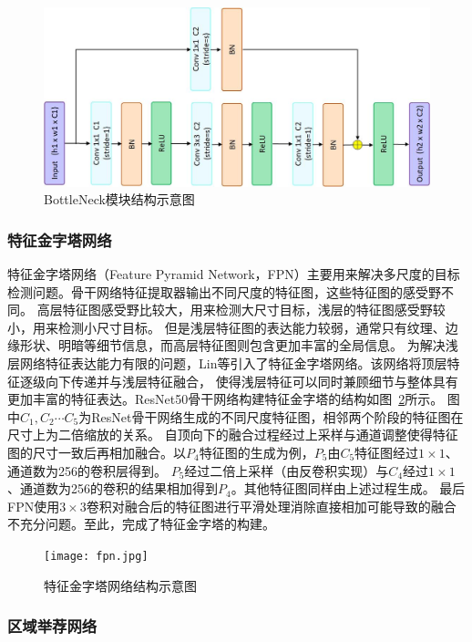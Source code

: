 \begin{figure}         
  \centering          
  \includegraphics[width=0.7\linewidth]{bottleneck.jpg}          
  \caption{BottleNeck模块结构示意图}          
  \label{fig:bottleneck}   
\end{figure}    

\subsubsection{特征金字塔网络}

特征金字塔网络（Feature Pyramid Network，FPN）主要用来解决多尺度的目标检测问题。骨干网络特征提取器输出不同尺度的特征图，这些特征图的感受野不同。
高层特征图感受野比较大，用来检测大尺寸目标，浅层的特征图感受野较小，用来检测小尺寸目标。
但是浅层特征图的表达能力较弱，通常只有纹理、边缘形状、明暗等细节信息，而高层特征图则包含更加丰富的全局信息。
为解决浅层网络特征表达能力有限的问题，Lin等\cite{2017Feature}引入了特征金字塔网络。该网络将顶层特征逐级向下传递并与浅层特征融合，
使得浅层特征可以同时兼顾细节与整体具有更加丰富的特征表达。ResNet50骨干网络构建特征金字塔的结构如图~\ref{fig:fpn}所示。
图中$C_1,C_2 \cdots C_5$为ResNet骨干网络生成的不同尺度特征图，相邻两个阶段的特征图在尺寸上为二倍缩放的关系。
自顶向下的融合过程经过上采样与通道调整使得特征图的尺寸一致后再相加融合。以$P_4$特征图的生成为例，$P_5$由$C_5$特征图经过$1\times1$、通道数为256的卷积层得到。
$P_5$经过二倍上采样（由反卷积实现）与$C_4$经过$1\times1$、通道数为256的卷积的结果相加得到$P_4$。其他特征图同样由上述过程生成。
最后FPN使用$3 \times 3$卷积对融合后的特征图进行平滑处理消除直接相加可能导致的融合不充分问题。至此，完成了特征金字塔的构建。

\begin{figure}            
  \centering             
  \texttt{[image: fpn.jpg]}             
  \caption{特征金字塔网络结构示意图}             
  \label{fig:fpn}    
\end{figure}    

\subsubsection{区域举荐网络}

